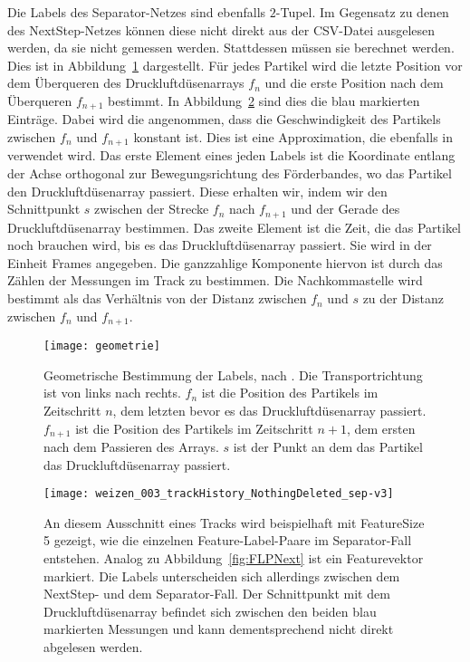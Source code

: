 Die Labels des Separator-Netzes sind ebenfalls \(2\)-Tupel.
Im Gegensatz zu denen des NextStep-Netzes können diese nicht direkt aus der CSV-Datei ausgelesen werden, da sie nicht gemessen werden.
Stattdessen müssen sie berechnet werden.
Dies ist in Abbildung~\ref{fig:Schnittpunkt} dargestellt.
Für jedes Partikel wird die letzte Position vor dem Überqueren des Druckluftdüsenarrays \(f_n\) 
und die erste Position nach dem Überqueren \(f_{n+1}\) bestimmt.
In Abbildung~\ref{fig:FLPSep} sind dies die blau markierten Einträge. 
Dabei wird die angenommen, dass die Geschwindigkeit des Partikels zwischen \(f_n\) und \(f_{n+1}\) konstant ist.
Dies ist eine Approximation, die ebenfalls in~\cite{Pfaff2018} verwendet wird.
Das erste Element eines jeden Labels ist die Koordinate entlang der Achse orthogonal zur Bewegungsrichtung des Förderbandes, wo das Partikel den Druckluftdüsenarray passiert.
Diese erhalten wir, indem wir den Schnittpunkt \(s\) zwischen der Strecke \(f_n\) nach \(f_{n+1}\) und 
der Gerade des Druckluftdüsenarray bestimmen.
Das zweite Element ist die Zeit, die das Partikel noch brauchen wird, bis es das Druckluftdüsenarray passiert.
Sie wird in der Einheit Frames angegeben.
Die ganzzahlige Komponente hiervon ist durch das Zählen der Messungen im Track zu bestimmen.
Die Nachkommastelle wird bestimmt als das Verhältnis von der Distanz zwischen \(f_n\) und \(s\) 
zu der Distanz zwischen \(f_n\) und \(f_{n+1}\).

\begin{figure}[h]
	\centering
	\texttt{[image: geometrie]}
	\caption[Geometrische Bestimmung der Labels, nach \cite{Pfaff2018}.]{Geometrische Bestimmung der Labels, nach \cite{Pfaff2018}.
	Die Transportrichtung ist von links nach rechts. 
	\(f_n\) ist die Position des Partikels im Zeitschritt \(n\), dem letzten bevor es das Druckluftdüsenarray passiert.
	\(f_{n+1}\) ist die Position des Partikels im Zeitschritt \(n+1\), dem ersten nach dem Passieren des Arrays.
	\(s\) ist der Punkt an dem das Partikel das Druckluftdüsenarray passiert.
	}
	\label{fig:Schnittpunkt}
\end{figure}

\begin{figure}[h]
	\centering
	\texttt{[image: weizen\_003\_trackHistory\_NothingDeleted\_sep-v3]}
	\caption[Beispiel Feature-Label-Paar Separator]{An diesem Ausschnitt eines Tracks wird beispielhaft mit FeatureSize 5 gezeigt, wie die einzelnen Feature-Label-Paare im Separator-Fall entstehen.
	Analog zu Abbildung~\ref{fig:FLPNext} ist ein Featurevektor markiert. Die Labels unterscheiden sich allerdings zwischen dem NextStep- und dem Separator-Fall. 
	Der Schnittpunkt mit dem Druckluftdüsenarray befindet sich zwischen den beiden blau markierten Messungen und kann dementsprechend nicht direkt abgelesen werden.}
	\label{fig:FLPSep}
\end{figure}


